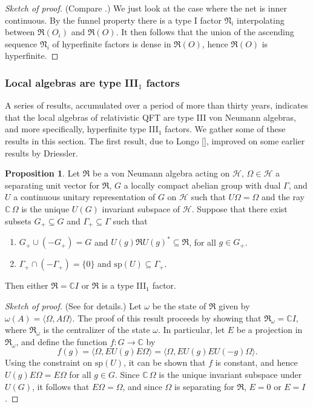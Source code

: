 \documentclass[12pt]{article}
\newcommand{\alg}[1]{\mathfrak{#1}}
\theoremstyle{definition}
\newtheorem{prop}[thm]{Proposition}
\theoremstyle{definition}
\theoremstyle{remark}
\def\2#1{{\mathcal #1}}
\def\7#1{{\mathbb #1}}
\def\al#1{{\mathfrak #1}}
\def\om{\omega} \def\Om{\Omega} \def\dd{\partial} \def\D{\Delta}
\def\G{\Gamma}
\begin{document}
\begin{proof}[Sketch of proof] (Compare \cite[p.\ 134]{typeIII}.) We
  just look at the case where the net is inner continuous.  By the
  funnel property there is a type I factor $\alg{N}_i$ interpolating
  between $\alg{R}(O_i)$ and $\alg{R}(O)$.  It then follows that the
  union of the ascending sequence $\alg{N}_i$ of hyperfinite factors
  is dense in $\alg{R}(O)$, hence $\alg{R}(O)$ is hyperfinite.
\end{proof}

\subsubsection{Local algebras are type III$_1$ factors}

A series of results, accumulated over a period of more than thirty
years, indicates that the local algebras of relativistic QFT are type
III von Neumann algebras, and more specifically, hyperfinite type
III$_1$ factors.  We gather some of these results in this section.
The first result, due to Longo [\citeyear{lon}], improved on some
earlier results by Driessler.

\begin{prop} Let $\al R$ be a von Neumann algebra acting on $\2H$,
  $\Om \in \2H$ a separating unit vector for $\al R$, $G$ a locally
  compact abelian group with dual $\G$, and $U$ a continuous unitary
  representation of $G$ on $\2H$ such that $U\Om =\Om$ and the ray
  $\7C\, \Om$ is the unique $U(G)$ invariant subspace of $\2H$.
  Suppose that there exist subsets $G_+\subseteq G$ and $\G
  _+\subseteq \G$ such that
\begin{enumerate}
\item $G_+\cup (-G_+)=G$ and $U(g)\al RU(g)^*\subseteq \al R$, for all
  $g\in G_+$.
\item $\G _+\cap (-\G _+)=\{ 0\}$ and $\mathrm{sp}(U)\subseteq \G _+$.
\end{enumerate}
Then either $\al R=\7C I$ or $\al R$ is a type III$_1$ factor. \label{half-sided}
\end{prop}

\begin{proof}[Sketch of proof] (See \cite[p.\ 203]{lon} for details.)
  Let $\om$ be the state of $\al R$ given by $\om (A)=\langle \Om
  ,A\Om \rangle $.  The proof of this result proceeds by showing that
  $\al R_\om =\7C I$, where $\al R_\om$ is the centralizer of the
  state $\om$.  In particular, let $E$ be a projection in $\al R_\om$,
  and define the function $f:G\to \7C$ by
  $$ f(g)=\langle \Om ,EU(g)E\Om \rangle =\langle \Om ,EU(g)EU(-g)\Om
  \rangle .$$ Using the constraint on $\mathrm{sp}(U)$, it can be
  shown that $f$ is constant, and hence $U(g)E\Om =E\Om$ for all $g\in
  G$.  Since $\7C \,\Om$ is the unique invariant subspace under
  $U(G)$, it follows that $E\Om =\Om$, and since $\Om$ is separating
  for $\al R$, $E=0$ or $E=I$.
\end{proof}
\end{document}
